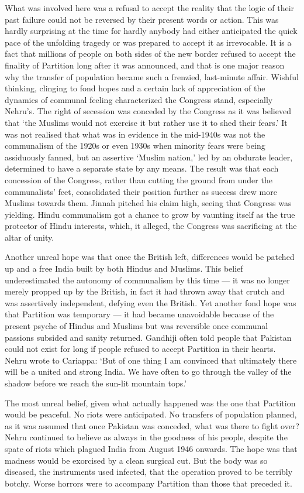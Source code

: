 What was involved here was a refusal to accept the reality that the logic of their past failure could not be reversed by their present words or action. This was hardly surprising at the time for hardly anybody had either anticipated the quick pace of the unfolding tragedy or was prepared to accept it as irrevocable. It is a fact that millions of people on both sides of the new border refused to accept the finality of Partition long after it was announced, and that is one major reason why the transfer of population became such a frenzied, last-minute affair. Wishful thinking, clinging to fond hopes and a certain lack of appreciation of the dynamics of communal feeling characterized the Congress stand, especially Nehru's. The right of secession was conceded by the Congress as it was believed that `the Muslims would not exercise it but rather use it to shed their fears.' It was not realised that what was in evidence in the mid-1940s was not the communalism of the 1920s or even 1930s when minority fears were being assiduously fanned, but an assertive `Muslim nation,' led by an obdurate leader, determined to have a separate state by any means. The result was that each concession of the Congress, rather than cutting the ground from under the communalists' feet, consolidated their position further as success drew more Muslims towards them. Jinnah pitched his claim high, seeing that Congress was yielding. Hindu communalism got a chance to grow by vaunting itself as the true protector of Hindu interests, which, it alleged, the Congress was sacrificing at the altar of unity. 

Another unreal hope was that once the British left, differences would be patched up and a free India built by both Hindus and Muslims. This belief underestimated the autonomy of communalism by this time --- it was no longer merely propped up by the British, in fact it had thrown away that crutch and was assertively independent, defying even the British. Yet another fond hope was that Partition was temporary --- it had became unavoidable because of the present psyche of Hindus and Muslims but was reversible once communal passions subsided and sanity returned. Gandhiji often told people that Pakistan could not exist for long if people refused to accept Partition in their hearts. Nehru wrote to Cariappa: `But of one thing I am convinced that ultimately there will be a united and strong India. We have often to go through the valley of the shadow before we reach the sun-lit mountain tops.' 

The most unreal belief, given what actually happened was the one that Partition would be peaceful. No riots were anticipated. No transfers of population planned, as it was assumed that once Pakistan was conceded, what was there to fight over? Nehru continued to believe as always in the goodness of his people, despite the spate of riots which plagued India from August 1946 onwards. The hope was that madness would be exorcised by a clean surgical cut. But the body was so diseased, the instruments used infected, that the operation proved to be terribly botchy. Worse horrors were to accompany Partition than those that preceded it. 

